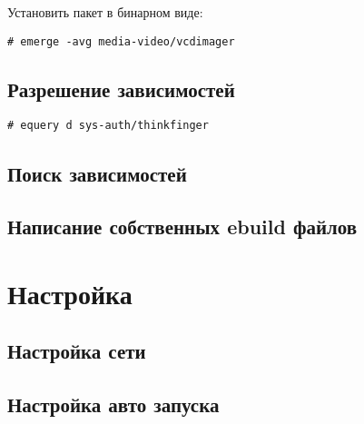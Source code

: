 \documentclass[12pt, a6paper]{article}
\begin{document}
Установить пакет в бинарном виде:

\begin{verbatim}
# emerge -avg media-video/vcdimager
\end{verbatim}

\subsection{Разрешение зависимостей}

\begin{verbatim}
# equery d sys-auth/thinkfinger
\end{verbatim}

\subsection{Поиск зависимостей}

\subsection{Написание собственных ebuild файлов}

\newpage
\section{Настройка}

\subsection{Настройка сети}

\subsection{Настройка авто запуска}

\end{document}
